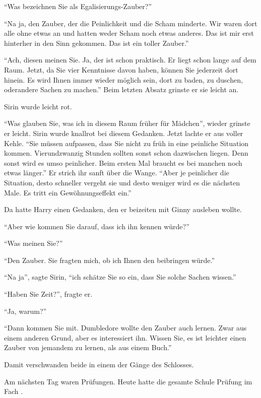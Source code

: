 \enquote{Was bezeichnen Sie als Egalisierungs-Zauber?}

\enquote{Na ja, den Zauber, der die Peinlichkeit und die Scham minderte. Wir waren dort alle ohne etwas an und hatten weder Scham noch etwas anderes. Das ist mir erst hinterher in den Sinn gekommen. Das ist ein toller Zauber.}

\enquote{Ach, diesen meinen Sie. Ja, der ist schon praktisch. Er liegt schon lange auf dem Raum. Jetzt, da Sie vier Kenntnisse davon haben, können Sie jederzeit dort hinein. Es wird Ihnen immer wieder möglich sein, dort zu baden, zu duschen, oder\abs andere Sachen zu machen.} Beim letzten Absatz grinste er sie leicht an.

Sirin wurde leicht rot.

\enquote{Was glauben Sie, was ich in diesem Raum früher für Mädchen\abs}, wieder grinste er leicht. Sirin wurde knallrot bei diesem Gedanken. Jetzt lachte er aus voller Kehle. \enquote{Sie müssen aufpassen, dass Sie nicht zu früh in eine peinliche Situation kommen. Vierundzwanzig Stunden sollten sonst schon dazwischen liegen. Denn sonst wird es umso peinlicher. Beim ersten Mal braucht es bei manchen noch etwas länger.} Er strich ihr sanft über die Wange. \enquote{Aber je peinlicher die Situation, desto schneller vergeht sie und desto weniger wird es die nächsten Male. Es tritt ein Gewöhnungseffekt ein.}

Da hatte Harry einen Gedanken, den er beizeiten mit Ginny ausleben wollte.

\enquote{Aber wie kommen Sie darauf, dass ich ihn kennen würde?}

\enquote{Was meinen Sie?}

\enquote{Den Zauber. Sie fragten mich, ob ich Ihnen den beibringen würde.}

\enquote{Na ja}, sagte Sirin, \enquote{ich schätze Sie so ein, dass Sie solche Sachen wissen.}

\enquote{Haben Sie Zeit?}, fragte er.

\enquote{Ja, warum?}

\enquote{Dann kommen Sie mit. Dumbledore wollte den Zauber auch lernen. Zwar aus einem anderen Grund, aber es interessiert ihn. Wissen Sie, es ist leichter einen Zauber von jemandem zu lernen, als aus einem Buch.}

Damit verschwanden beide in einem der Gänge des Schlosses.

Am nächsten Tag waren Prüfungen. Heute hatte die gesamte Schule Prüfung im Fach \VgddK.

